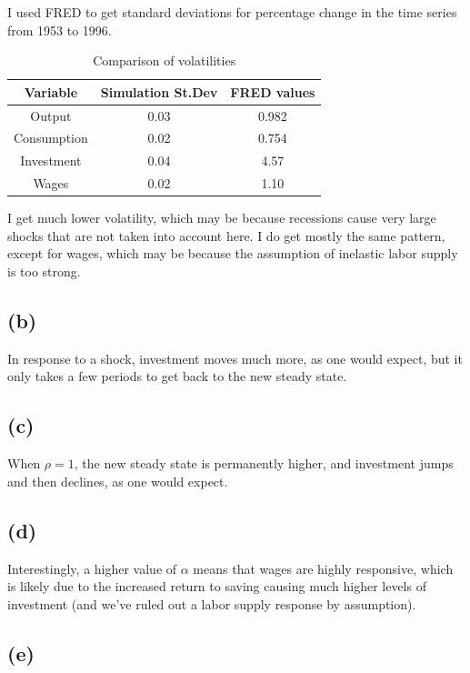 \documentclass[11pt]{amsart}
\begin{document}
I used FRED to get standard deviations for percentage change in the time series from 1953 to 1996.     
\begin{table}[]
    	\centering
    	\begin{tabular}{ccc}
    		\hline \hline 
    		 Variable  & Simulation St.Dev           &  FRED values \\
    		\hline 
    	    Output                &  0.03       &   0.982      \\
    		Consumption      &   0.02      &   0.754         \\
    	    Investment         &   0.04      &    4.57       \\
	    Wages & 0.02 & 1.10
	        	\end{tabular}
    	\caption{Comparison of volatilities}
    \end{table}
I get much lower volatility, which may be because recessions cause very large shocks that are not taken into account here. I do get mostly the same pattern, except for wages, which may be because the assumption of inelastic labor supply is too strong.

\subsection*{(b)}

In response to a shock, investment moves much more, as one would expect, but it only takes a few periods to get back to the new steady state.

\subsection*{(c)}

When $\rho=1$, the new steady state is permanently higher, and investment jumps and then declines, as one would expect.

\subsection*{(d)}

Interestingly, a higher value of $\alpha$ means that wages are highly responsive, which is likely due to the increased return to saving causing much higher levels of investment (and we've ruled out a labor supply response by assumption).

\subsection*{(e)}
\end{document}
